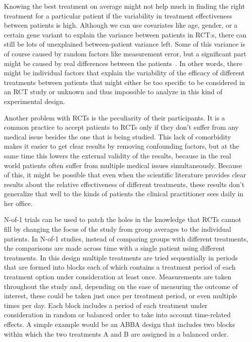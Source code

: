 \documentclass[12pt,a4paper,leqno]{report}
\theoremstyle{plain}
\theoremstyle{definition}
\theoremstyle{remark}
\begin{document}
Knowing the best treatment on average might not help much in finding the right
treatment for a particular patient if the variability in treatment effectiveness
between patients is high. Although we can use covariates like age, gender, or
a certain gene variant to explain the variance between patients in RCT:s, there
can still be lots of unexplained between-patient variance left. Some
of this variance is of course caused by random factors like measurement error,
but a significant part might be caused by real differences between the patients\ \cite{HTE1, HTE2, HTE3, HTE4}.
In other words, there might be individual factors that explain the variability
of the efficacy of different treatments between patients that might either be
too specific to be considered in an RCT study or unknown and thus impossible to
analyze in this kind of experimental design.

Another problem with RCTs is the peculiarity of their participants. It is
a common practice to accept patients to RCTs only if they don't suffer from any
medical issue besides the one that is being studied. This lack of comorbidity
makes it easier to get clear results by removing confounding factors, but at the
same time this lowers the external validity of the results, because in the real
world patients often suffer from multiple medical issues simultaneously. Because of this, it might be possible that even when the scientific
literature provides clear results about the relative effectiveness of different
treatments, these results don't generalize that well to the kinds of
patients the clinical practitioner sees daily in her office.\ \cite{HTE1}

N-of-1 trials can be used to patch the holes in the knowledge that RCTs cannot
fill by changing the focus of the study from group averages to the individual
patients. In N-of-1 studies, instead of comparing groups with different treatments,
the comparisons are made across time with a single patient using different
treatments. In this design multiple treatments are tried sequentially in periods
that are formed into blocks each of which contains a treatment period of each
treatment option under consideration at least once. Measurements are taken throughout the
study and, depending on the
ease of measuring the outcome of interest, these could be taken just
once per treatment period, or even multiple times per day. Each block includes a
period of each treatment under consideration in random or balanced order to take
into account time-related effects. A simple example would be an ABBA design that
includes two blocks within which the two treatments A and B are assigned in a
balanced order.
\end{document}
